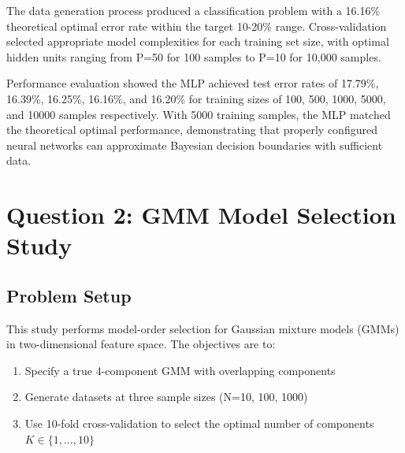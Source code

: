 \documentclass[12pt]{article}
\begin{document}
The data generation process produced a classification problem with a 16.16\% theoretical optimal error rate within the target 10-20\% range. Cross-validation selected appropriate model complexities for each training set size, with optimal hidden units ranging from P=50 for 100 samples to P=10 for 10,000 samples.

Performance evaluation showed the MLP achieved test error rates of 17.79\%, 16.39\%, 16.25\%, 16.16\%, and 16.20\% for training sizes of 100, 500, 1000, 5000, and 10000 samples respectively. With 5000 training samples, the MLP matched the theoretical optimal performance, demonstrating that properly configured neural networks can approximate Bayesian decision boundaries with sufficient data.


\newpage
\section*{Question 2: GMM Model Selection Study}

\subsection{Problem Setup}
This study performs model-order selection for Gaussian mixture models (GMMs) in two-dimensional feature space. The objectives are to:
\begin{enumerate}
    \item Specify a true 4-component GMM with overlapping components
    \item Generate datasets at three sample sizes (N=10, 100, 1000)
    \item Use 10-fold cross-validation to select the optimal number of components $K\in\{1,\dots,10\}$
\end{enumerate}
\end{document}
